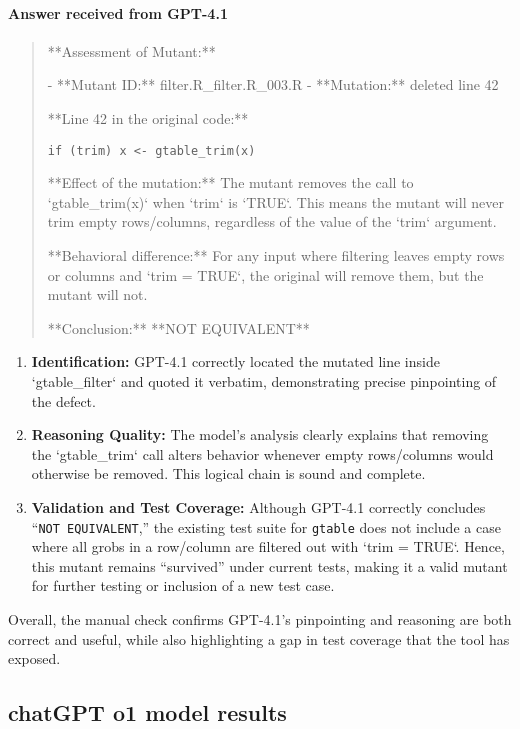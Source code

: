 \paragraph{Answer received from GPT-4.1}
\begin{quote}
**Assessment of Mutant:**

- **Mutant ID:** filter.R_filter.R_003.R  
- **Mutation:** deleted line 42

**Line 42 in the original code:**
\begin{verbatim}
if (trim) x <- gtable_trim(x)
\end{verbatim}

**Effect of the mutation:**  
The mutant removes the call to `gtable_trim(x)` when `trim` is `TRUE`. This means the mutant will never trim empty rows/columns, regardless of the value of the `trim` argument.

**Behavioral difference:**  
For any input where filtering leaves empty rows or columns and `trim = TRUE`, the original will remove them, but the mutant will not.

**Conclusion:**  
**NOT EQUIVALENT**
\end{quote}

\begin{enumerate}
  \item \textbf{Identification:}  
    GPT-4.1 correctly located the mutated line inside `gtable_filter` and quoted it verbatim, demonstrating precise pinpointing of the defect.
  
  \item \textbf{Reasoning Quality:}  
    The model’s analysis clearly explains that removing the `gtable_trim` call alters behavior whenever empty rows/columns would otherwise be removed.  This logical chain is sound and complete.

  \item \textbf{Validation and Test Coverage:}  
    Although GPT-4.1 correctly concludes “\texttt{NOT EQUIVALENT},” the existing test suite for \texttt{gtable} does not include a case where all grobs in a row/column are filtered out with `trim = TRUE`.  Hence, this mutant remains “survived” under current tests, making it a valid mutant for further testing or inclusion of a new test case.
\end{enumerate}

Overall, the manual check confirms GPT-4.1’s pinpointing and reasoning are both correct and useful, while also highlighting a gap in test coverage that the tool has exposed.


\subsection{chatGPT o1 model results}

